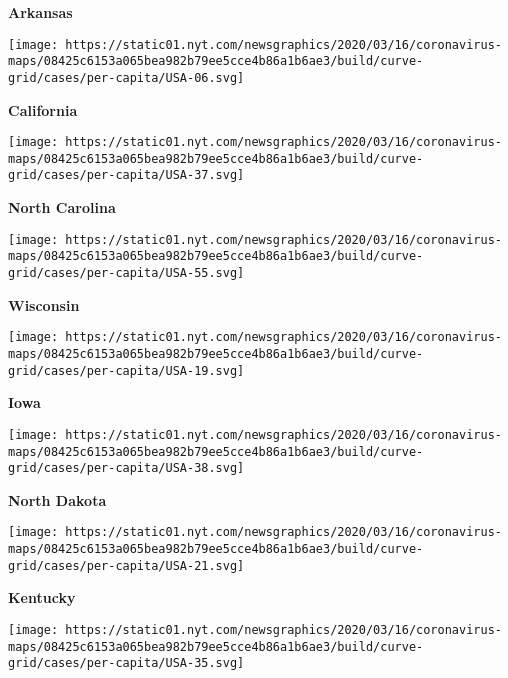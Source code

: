 \textbf{Arkansas}

\href{https://www.nytimes.com/interactive/2020/us/california-coronavirus-cases.html}{}

\texttt{[image: https://static01.nyt.com/newsgraphics/2020/03/16/coronavirus-maps/08425c6153a065bea982b79ee5cce4b86a1b6ae3/build/curve-grid/cases/per-capita/USA-06.svg]}

\textbf{California}

\href{https://www.nytimes.com/interactive/2020/us/north-carolina-coronavirus-cases.html}{}

\texttt{[image: https://static01.nyt.com/newsgraphics/2020/03/16/coronavirus-maps/08425c6153a065bea982b79ee5cce4b86a1b6ae3/build/curve-grid/cases/per-capita/USA-37.svg]}

\textbf{North Carolina}

\href{https://www.nytimes.com/interactive/2020/us/wisconsin-coronavirus-cases.html}{}

\texttt{[image: https://static01.nyt.com/newsgraphics/2020/03/16/coronavirus-maps/08425c6153a065bea982b79ee5cce4b86a1b6ae3/build/curve-grid/cases/per-capita/USA-55.svg]}

\textbf{Wisconsin}

\href{https://www.nytimes.com/interactive/2020/us/iowa-coronavirus-cases.html}{}

\texttt{[image: https://static01.nyt.com/newsgraphics/2020/03/16/coronavirus-maps/08425c6153a065bea982b79ee5cce4b86a1b6ae3/build/curve-grid/cases/per-capita/USA-19.svg]}

\textbf{Iowa}

\href{https://www.nytimes.com/interactive/2020/us/north-dakota-coronavirus-cases.html}{}

\texttt{[image: https://static01.nyt.com/newsgraphics/2020/03/16/coronavirus-maps/08425c6153a065bea982b79ee5cce4b86a1b6ae3/build/curve-grid/cases/per-capita/USA-38.svg]}

\textbf{North Dakota}

\href{https://www.nytimes.com/interactive/2020/us/kentucky-coronavirus-cases.html}{}

\texttt{[image: https://static01.nyt.com/newsgraphics/2020/03/16/coronavirus-maps/08425c6153a065bea982b79ee5cce4b86a1b6ae3/build/curve-grid/cases/per-capita/USA-21.svg]}

\textbf{Kentucky}

\href{https://www.nytimes.com/interactive/2020/us/new-mexico-coronavirus-cases.html}{}

\texttt{[image: https://static01.nyt.com/newsgraphics/2020/03/16/coronavirus-maps/08425c6153a065bea982b79ee5cce4b86a1b6ae3/build/curve-grid/cases/per-capita/USA-35.svg]}

